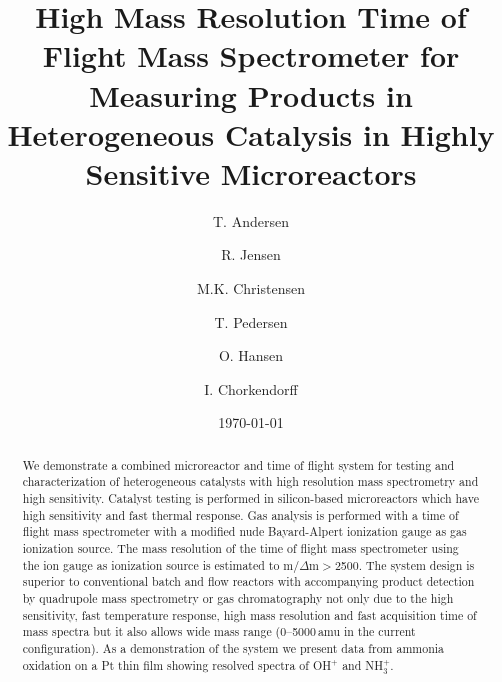 \documentclass[aip,rsi]{revtex4-1}
\begin{document}

\title{High Mass Resolution Time of Flight Mass Spectrometer for Measuring Products in Heterogeneous Catalysis in Highly Sensitive Microreactors} %



\author{T. Andersen}
\author{R. Jensen}
\author{M.K. Christensen}
\author{T. Pedersen}
\author{O. Hansen}
\author{I. Chorkendorff}


\date{\today}

\begin{abstract}
We demonstrate a combined microreactor and time of flight system for testing and characterization of heterogeneous catalysts with high resolution mass spectrometry and high sensitivity. Catalyst testing is performed in silicon-based microreactors which have high sensitivity and fast thermal response. Gas analysis is performed with a time of flight mass spectrometer with a modified nude Bayard-Alpert ionization gauge as gas ionization source. The mass resolution of the time of flight mass spectrometer using the ion gauge as ionization source is estimated to m/$\Delta$m$>$2500. The system design is superior to conventional batch and flow reactors with accompanying product detection by quadrupole mass spectrometry or gas chromatography not only due to the high sensitivity, fast temperature response, high mass resolution and fast acquisition time of mass spectra but it also allows wide mass range (0--5000\,amu in the current configuration). As a demonstration of the system we present data from ammonia oxidation on a Pt thin film showing resolved spectra of OH$^{+}$ and NH$_{3}^{+}$.
\end{abstract}
\end{document}
